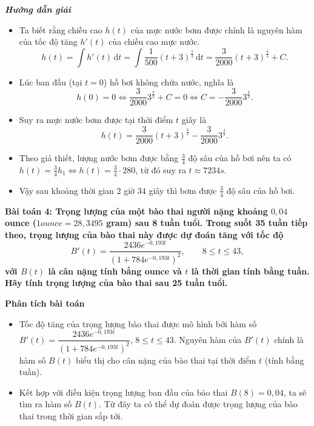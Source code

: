 \documentclass[12pt,a4paper]{article}
\newcommand{\dd}{\,\mathrm{d}}
\newcommand{\analysis}{\noindent\raisebox{0.15ex}{\rule{1.6ex}{1.6ex}}\hspace{4pt}\textbf{Phân tích bài toán}\par}
\newcommand{\solution}{\begin{center}\textbf{\textit{Hướng dẫn giải}}\end{center}\par}
\begin{document}
\solution
\begin{itemize}
\item Ta biết rằng chiều cao $h(t)$ của mực nước bơm được chính là nguyên hàm của tốc độ tăng $h'(t)$ của chiều cao mực nước.
\[
h(t)=\int h'(t)\dd t=\int\frac1{500}(t+3)^{\frac{1}{3}}\dd t
=\frac3{2000}(t+3)^{\frac{4}{3}}+C.
\]
\item Lúc ban đầu (tại $t=0$) hồ bơi không chứa nước, nghĩa là
\[
h(0)=0\Leftrightarrow\frac3{2000}3^{\frac{4}{3}}+C=0
\Leftrightarrow C=-\frac3{2000}3^{\frac{4}{3}}.
\]
\item Suy ra mực nước bơm được tại thời điểm $t$ giây là
\[
h(t)=\frac3{2000}(t+3)^{\frac{4}{3}}-\frac3{2000}3^{\frac{4}{3}}.
\]
\item Theo giả thiết, lượng nước bơm được bằng $\frac34$ độ sâu của hồ bơi nên ta có $h(t)=\frac34h_1\Leftrightarrow h(t)=\frac34\cdot280$, từ đó suy ra $t\approx7234s$.
\item Vậy sau khoảng thời gian $2$ giờ $34$ giây thì bơm được $\frac34$ độ sâu của hồ bơi.
\end{itemize}

\textbf{Bài toán 4: Trọng lượng của một bào thai người nặng khoảng $0,04$ ounce ($1ounce=28,3495$ gram) sau 8 tuần tuổi. Trong suốt 35 tuần tiếp theo, trọng lượng của bào thai này được dự đoán tăng với tốc độ \[ B'(t)=\frac{2436e^{-0,193t}}{(1+784e^{-0,193t})^2},\qquad8\le t\le43, \] với $B(t)$ là cân nặng tính bằng ounce và $t$ là thời gian tính bằng tuần. Hãy tính trọng lượng của bào thai sau 25 tuần tuổi.}\par\medskip
\begin{analysisbox}
\analysis
\begin{itemize}
\item Tốc độ tăng của trọng lượng bào thai được mô hình bởi hàm số
$B'(t)=\dfrac{2436e^{-0,193t}}{(1+784e^{-0,193t})^2}$, $8\le t\le43$. Nguyên hàm của $B'(t)$ chính là hàm số $B(t)$ biểu thị cho cân nặng của bào thai tại thời điểm $t$ (tính bằng tuần).
\item Kết hợp với điều kiện trọng lượng ban đầu của bào thai $B(8)=0,04$, ta sẽ tìm ra hàm số $B(t)$. Từ đây ta có thể dự đoán được trọng lượng của bào thai trong thời gian sắp tới.
\end{itemize}
\end{analysisbox}
\end{document}
